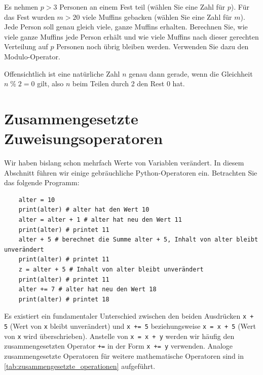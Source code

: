 \begin{myexercise}\label{ex:modulo_muffin}
	Es nehmen $p>3$ Personen an einem Fest teil (wählen Sie eine Zahl für $p$). Für das Fest wurden $m > 20$ viele Muffins gebacken (wählen Sie eine Zahl für $m$). Jede Person soll genau gleich viele, ganze Muffins erhalten. Berechnen Sie, wie viele ganze Muffins jede Person erhält und wie viele Muffins nach dieser gerechten Verteilung auf $p$ Personen noch übrig bleiben werden. Verwenden Sie dazu den Modulo-Operator.
	\begin{myanswer}
		
	\end{myanswer}
\end{myexercise}

\begin{myexample}
Offensichtlich ist eine natürliche Zahl $n$ genau dann gerade, wenn die Gleichheit $n \;\%\; 2 = 0$ gilt, also $n$ beim Teilen durch 2 den Rest 0 hat.
\end{myexample}


\section{Zusammengesetzte Zuweisungsoperatoren}
Wir haben bislang schon mehrfach Werte von Variablen verändert. In diesem Abschnitt führen wir einige gebräuchliche Python-Operatoren ein. Betrachten Sie das folgende Programm:
\begin{lstlisting}
	alter = 10
	print(alter) # alter hat den Wert 10
	alter = alter + 1 # alter hat neu den Wert 11
	print(alter) # printet 11
	alter + 5 # berechnet die Summe alter + 5, Inhalt von alter bleibt unverändert
	print(alter) # printet 11
	z = alter + 5 # Inhalt von alter bleibt unverändert
	print(alter) # printet 11
	alter += 7 # alter hat neu den Wert 18
	print(alter) # printet 18
\end{lstlisting}
Es existiert ein fundamentaler Unterschied zwischen den beiden Ausdrücken \lstinline|x + 5| (Wert von \lstinline|x| bleibt unverändert) und \lstinline|x += 5| beziehungsweise \lstinline|x = x + 5| (Wert von \lstinline|x| wird überschrieben). Anstelle von \lstinline|x = x + y| werden wir häufig den zusammengesetzten Operator \lstinline|+=| in der Form \lstinline|x += y| verwenden. Analoge zusammengesetzte Operatoren für weitere mathematische Operatoren sind in \cref{tab:zusammengesetzte_operationen} aufgeführt.


